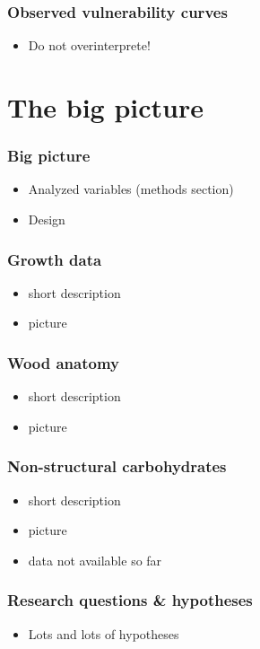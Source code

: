 \documentclass[usepdftitle=false]{beamer}
\begin{document}
\begin{frame}
	\frametitle{Observed vulnerability curves}
	\begin{itemize}
		\item Do not overinterprete!
	\end{itemize}
\end{frame}

\section{The big picture}
\begin{frame}
	\frametitle{Big picture}
	\begin{itemize}
		\item Analyzed variables (methods section)
		\item Design		
	\end{itemize}
\end{frame}

\begin{frame}
	\frametitle{Growth data}
	\begin{itemize}
		\item short description
		\item picture
	\end{itemize}
\end{frame}

\begin{frame}
	\frametitle{Wood anatomy}
	\begin{itemize}
		\item short description
		\item picture
	\end{itemize}
\end{frame}

\begin{frame}
	\frametitle{Non-structural carbohydrates}
	\begin{itemize}
		\item short description
		\item picture
		\item data not available so far
	\end{itemize}
\end{frame}

\begin{frame}
	\frametitle{Research questions \& hypotheses}
	\begin{itemize}
		\item Lots and lots of hypotheses
	\end{itemize}
\end{frame}
\end{document}

